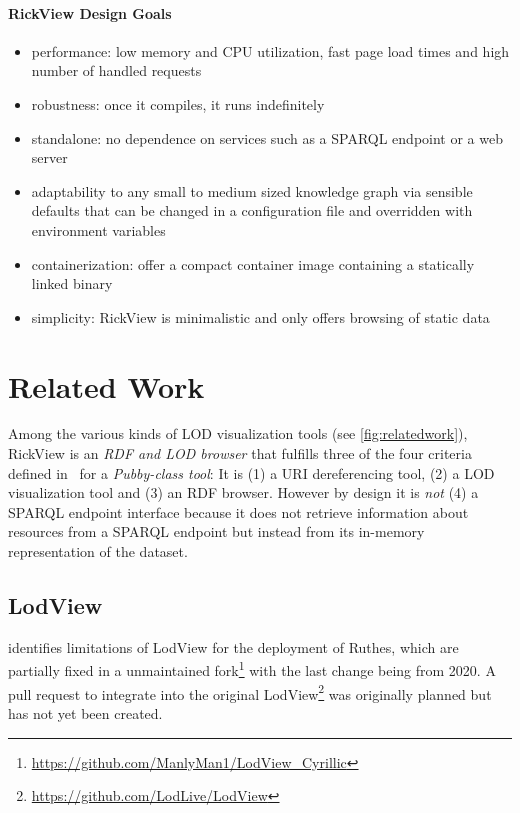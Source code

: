 \documentclass{ceurart}
\begin{document}
\paragraph{RickView Design Goals}
\begin{itemize}
\item
  performance: low memory and CPU utilization, fast page load times and high number of handled requests
\item
  robustness: once it compiles, it runs indefinitely
\item
  standalone: no dependence on services such as a SPARQL endpoint or a web server
\item
  adaptability to any small to medium sized knowledge graph via sensible defaults that can be changed in a configuration file and overridden with environment variables
\item
  containerization: offer a compact container image containing a statically linked binary
\item
  simplicity: RickView is minimalistic and only offers browsing of static data
\end{itemize}

\section{Related Work}\label{relatedwork}

Among the various kinds of LOD visualization tools (see \cref{fig:relatedwork}), RickView is an \emph{RDF and LOD browser} that fulfills three of the four criteria defined in~\cite{adaptinglodview} for a \emph{Pubby-class tool}:
It is (1) a URI dereferencing tool, (2) a LOD visualization tool and (3) an RDF browser.
However by design it is \emph{not} (4) a SPARQL endpoint interface because it does not retrieve information about resources from a SPARQL endpoint but instead from its in-memory representation of the dataset.

\subsection{LodView}

\citep{adaptinglodview} identifies limitations of LodView for the deployment of Ruthes, which are partially fixed in a unmaintained fork\footnote{\url{https://github.com/ManlyMan1/LodView\_Cyrillic}} with the last change being from 2020.
A pull request to integrate into the original LodView\footnote{\url{https://github.com/LodLive/LodView}} was originally planned but has not yet been created.
\end{document}
